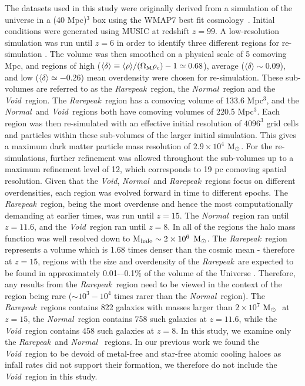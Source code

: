 \documentclass[twocolumn,iop,revtex4]{openjournal}
\newcommand{\msolar} {$\rm{M_{\odot}}~$}
\newcommand{\msolarc} {$\rm{M_{\odot}}$}
\newcommand{\rarepeak} {\textit{Rarepeak~}}
\newcommand{\normal} {\textit{Normal~}}
\newcommand{\void} {\textit{Void~}}
\newcommand{\voidc} {\textit{Void}}
\begin{document}
The datasets used in this study were originally derived from a simulation of the universe in a (40 Mpc)$^3$
box using the WMAP7 best fit cosmology~\citep{Komatsu_2011}.
Initial conditions were generated using
MUSIC \citep{Hahn_2011} at redshift $z = 99$. A low-resolution simulation was run until $z = 6$ in order to
identify three different regions for re-simulation \citep{Chen_2014}. The volume was then smoothed
on a physical scale of 5 comoving Mpc, and regions of high
($\langle\delta\rangle \equiv \langle\rho\rangle/(\Omega_{\rm M} \rho_{\rm c}) - 1 \simeq 0.68$),
average ($\langle\delta\rangle \sim 0.09$), and low ($\langle\delta\rangle \simeq -0.26$)
mean overdensity were chosen for re-simulation. These sub-volumes are referred to as the
\rarepeak region, the \normal region  and the \void region. The \rarepeak region has a comoving
volume of 133.6 Mpc$^3$, and the \normal and \void regions both have comoving volumes of 220.5
Mpc$^3$. Each region was then re-simulated with an effective initial resolution of $4096^3$ grid
cells and particles within these sub-volumes of the larger initial simulation. This gives a maximum
dark matter particle mass resolution of $2.9 \times 10^4$ \msolarc. For the re-simulations, further refinement was allowed throughout the sub-volumes up
to a maximum refinement level of 12, which corresponds to 19 pc comoving spatial resolution. Given
that the
\voidc, \normal and \rarepeak regions focus on different overdensities, each region was evolved forward in time to
different epochs. The \rarepeak region, being the most overdense and hence the most
computationally demanding at earlier times, was run until $z = 15$. The \normal region ran until $z =
11.6$, and the \void region ran until $z = 8$. In all of the regions the halo mass function was 
well resolved down to M$_{\rm halo} \sim 2 \times 10^6$ \msolarc. The \rarepeak region represents a
volume which is 1.68 times denser than the cosmic mean - therefore at $z = 15$, regions with the
size and overdensity of the \rarepeak are expected to be found in approximately 0.01-–0.1\%
of the volume of the Universe \citep{Wise_2019}. Therefore, any results from the
\rarepeak region need to be viewed in the context of the region being rare ($\sim 10^3 - 10^4$ times rarer than the \normal region).
The \rarepeak regions contains 822 galaxies with masses larger than $2 \times 10^7$ \msolar
at $z = 15$, the \normal region contains 758 such galaxies at $z = 11.6$, while the \void region
contains 458 such galaxies at $z = 8$. In this study, we examine only the \rarepeak and \normal
regions. In our previous work
\citep{Wise_2019, Regan_2020} we found the \void region to be devoid of metal-free and
star-free atomic cooling haloes as infall rates
did not support their formation, we therefore do not include the \void region in this study. 
\end{document}
